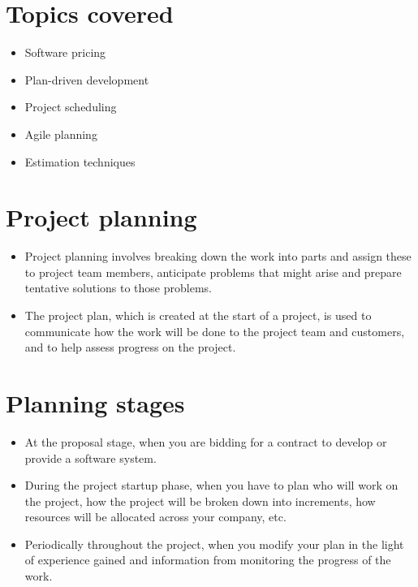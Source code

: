 \section{Topics covered}
\begin{itemize}
\item Software pricing

\item Plan-driven development

\item Project scheduling

\item Agile planning

\item Estimation techniques
\end{itemize}
\section{Project planning}
\begin{itemize}
\item Project planning involves breaking down the work into parts and assign these to project team members, anticipate problems that might arise and prepare tentative solutions to those problems.

\item The project plan, which is created at the start of a project, is used to communicate how the work will be done to the project team and customers, and to help assess progress on the project.
\end{itemize}
\section{Planning stages}
\begin{itemize}

\item At the proposal stage, when you are bidding for a contract to develop or provide a software system.

\item During the project startup phase, when you have to plan who will work on the project, how the project will be broken down into increments, how resources will be allocated across your company, etc.

\item Periodically throughout the project, when you modify your plan in the light of experience gained and information from monitoring the progress of the work.

\end{itemize}
